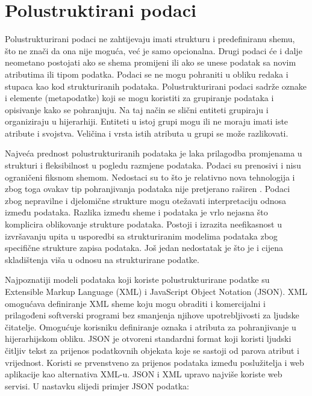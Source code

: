 \documentclass{foi}
\begin{document}
\section{Polustruktirani podaci}

Polustrukturirani podaci ne zahtijevaju imati strukturu i predefiniranu shemu, što ne znači da ona nije moguća, već je samo opcionalna. Drugi podaci će i dalje neometano postojati ako se shema promijeni ili ako se unese podatak sa novim atributima ili tipom podatka. Podaci se ne mogu pohraniti u obliku redaka i stupaca kao kod strukturiranih podataka. Polustrukturirani podaci sadrže oznake i elemente (metapodatke) koji se mogu koristiti za grupiranje podataka i opisivanje kako se pohranjuju. Na taj način se slični entiteti grupiraju i organiziraju u hijerarhiji. Entiteti u istoj grupi mogu ili ne moraju imati iste atribute i svojstva. Veličina i vrsta istih atributa u grupi se može razlikovati.

Najveća prednost polustrukturiranih podataka je laka prilagodba promjenama u strukturi i fleksibilnost u pogledu razmjene podataka. Podaci su prenosivi i nisu ograničeni fiksnom shemom. Nedostaci su to što je relativno nova tehnologija i zbog toga ovakav tip pohranjivanja podataka nije pretjerano raširen \cite{unstructuredStructuredSemiStructured}. Podaci zbog nepravilne i djelomične strukture mogu otežavati interpretaciju odnosa između podataka. Razlika između sheme i podataka je vrlo nejasna što komplicira oblikovanje strukture podataka. Postoji i izrazita neefikasnost u izvršavanju upita u usporedbi sa strukturiranim modelima podataka zbog specifične strukture zapisa podataka. Još jedan nedostatak je što je i cijena skladištenja viša u odnosu na strukturirane podatke. \cite{tbpknjiga}

Najpoznatiji modeli podataka koji koriste polustrukturirane podatke su Extensible Markup Language (XML) i JavaScript Object Notation (JSON). XML omogućava definiranje XML sheme koju mogu obraditi i komercijalni i prilagođeni softverski programi bez smanjenja njihove upotrebljivosti za ljudske čitatelje. Omogućuje korisniku definiranje oznaka i atributa za pohranjivanje u hijerarhijskom obliku. JSON je otvoreni standardni format koji koristi ljudski čitljiv tekst za prijenos podatkovnih objekata koje se sastoji od parova atribut i vrijednost. Koristi se prvenstveno za prijenos podataka između poslužitelja i web aplikacije kao alternativa XML-u. JSON i XML upravo najviše koriste web servisi. \cite{cros} U nastavku slijedi primjer JSON podatka:
\end{document}
